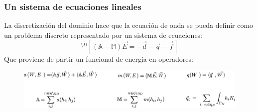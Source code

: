 \documentclass[xcolor=table,serif,handout]{beamer}
\begin{document}
	\begin{frame}
	\frametitle{Un sistema de ecuaciones lineales}
	
	La discretización del dominio hace que la ecuación de onda se pueda definir como un problema discreto representado por un sistema de ecuaciones:
	\begin{equation*}
^{\setminus D}\left[\left(\mathbb{A}-\mathbb{M}\right)\vec{E}= -\vec{d}-\vec{q}-\vec{f}\right]
\end{equation*}
	\pause
	Que proviene de partir un funcional de energía en operadores:
	\begin{figure}
	\includegraphics[scale=0.18]{matrices_3.eps}
	\end{figure}		
	
	
%	
	\end{frame}	
\end{document}

